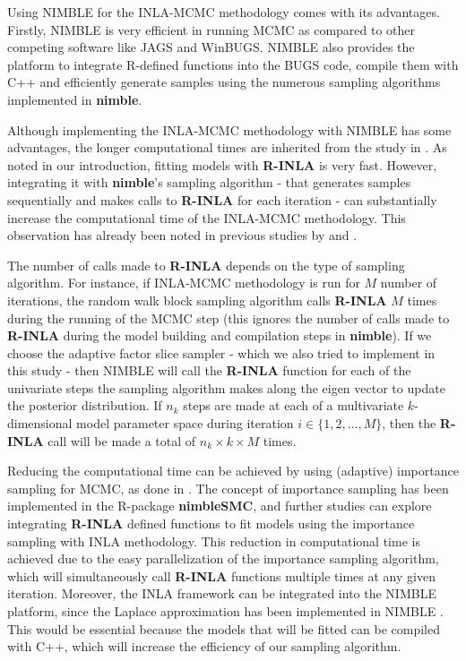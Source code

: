 \documentclass[
]{article}
\begin{document}
Using NIMBLE for the INLA-MCMC methodology comes with its advantages.
Firstly, NIMBLE is very efficient in running MCMC as compared to other
competing software like JAGS and WinBUGS. NIMBLE also provides the
platform to integrate R-defined functions into the BUGS code, compile
them with C++ and efficiently generate samples using the numerous
sampling algorithms implemented in \textbf{nimble}.

Although implementing the INLA-MCMC methodology with NIMBLE has some
advantages, the longer computational times are inherited from the study
in \cite{gomez2018markov}. As noted in our introduction, fitting models
with \textbf{R-INLA} is very fast. However, integrating it with
\textbf{nimble}'s sampling algorithm - that generates samples
sequentially and makes calls to \textbf{R-INLA} for each iteration - can
substantially increase the computational time of the INLA-MCMC
methodology. This observation has already been noted in previous studies
by \cite{gomez2018markov} and \cite{berild2022importance}.

The number of calls made to \textbf{R-INLA} depends on the type of
sampling algorithm. For instance, if INLA-MCMC methodology is run for
\(M\) number of iterations, the random walk block sampling algorithm
calls \textbf{R-INLA} \(M\) times during the running of the MCMC step
(this ignores the number of calls made to \textbf{R-INLA} during the
model building and compilation steps in \textbf{nimble}). If we choose
the adaptive factor slice sampler \citep{tibbits2014automated} - which
we also tried to implement in this study - then NIMBLE will call the
\textbf{R-INLA} function for each of the univariate steps the sampling
algorithm makes along the eigen vector to update the posterior
distribution. If \(n_k\) steps are made at each of a multivariate
\(k\)-dimensional model parameter space during iteration
\(i \in \{1, 2, \ldots, M\}\), then the \textbf{R-INLA} call will be
made a total of \(n_k \times k \times M\) times.

Reducing the computational time can be achieved by using (adaptive)
importance sampling for MCMC, as done in \cite{berild2022importance}.
The concept of importance sampling has been implemented in the R-package
\textbf{nimbleSMC}, and further studies can explore integrating
\textbf{R-INLA} defined functions to fit models using the importance
sampling with INLA methodology. This reduction in computational time is
achieved due to the easy parallelization of the importance sampling
algorithm, which will simultaneously call \textbf{R-INLA} functions
multiple times at any given iteration. Moreover, the INLA framework can
be integrated into the NIMBLE platform, since the Laplace approximation
has been implemented in NIMBLE \citep{nimblemanual}. This would be
essential because the models that will be fitted can be compiled with
C++, which will increase the efficiency of our sampling algorithm.
\end{document}
